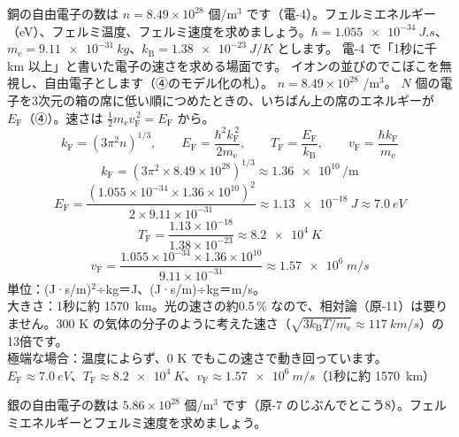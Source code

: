 \label{ph:原-8:ex4}
\begin{phreidai}
銅の自由電子の数は $n=8.49\times10^{28}$ 個/m$^3$ です（電-4）。フェルミエネルギー（eV）、フェルミ温度、フェルミ速度を求めましょう。$\hbar=\qty{1.055e-34}{J.s}$、$m_{\mathrm e}=\qty{9.11e-31}{kg}$、$k_{\mathrm B}=\qty{1.38e-23}{J/K}$ とします。
\phbamen
電-4 で「1秒に千 km 以上」と書いた電子の速さを求める場面です。
\phmushi
イオンの並びのでこぼこを無視し、自由電子とします（④のモデル化の札）。
\phzu
$n=8.49\times10^{28}$ /m$^3$。
\phriyu
$N$ 個の電子を3次元の箱の席に低い順につめたときの、いちばん上の席のエネルギーが $E_{\mathrm F}$（④）。速さは $\tfrac12m_{\mathrm e}v_{\mathrm F}^{\,2}=E_{\mathrm F}$ から。
\phtateru
\[ k_{\mathrm F}=(3\pi^2n)^{1/3},\qquad E_{\mathrm F}=\frac{\hbar^2k_{\mathrm F}^{\,2}}{2m_{\mathrm e}},\qquad T_{\mathrm F}=\frac{E_{\mathrm F}}{k_{\mathrm B}},\qquad v_{\mathrm F}=\frac{\hbar k_{\mathrm F}}{m_{\mathrm e}} \]
\phtoku
\[ k_{\mathrm F}=(3\pi^2\times8.49\times10^{28})^{1/3}\approx\num{1.36e10}\,\mathrm{/m} \]
\[ E_{\mathrm F}=\frac{(1.055\times10^{-34}\times1.36\times10^{10})^2}{2\times9.11\times10^{-31}}\approx\qty{1.13e-18}{J}\approx\qty{7.0}{eV} \]
\[ T_{\mathrm F}=\frac{1.13\times10^{-18}}{1.38\times10^{-23}}\approx\qty{8.2e4}{K} \]
\[ v_{\mathrm F}=\frac{1.055\times10^{-34}\times1.36\times10^{10}}{9.11\times10^{-31}}\approx\qty{1.57e6}{m/s} \]
\phtashikame
単位：(J·s/m)$^2$÷kg＝J、(J·s/m)÷kg＝m/s。\\
大きさ：1秒に約 \qty{1570}{km}。光の速さの約0.5\,\% なので、相対論（原-11）は要りません。300 K の気体の分子のように考えた速さ（$\sqrt{3k_{\mathrm B}T/m_{\mathrm e}}\approx\qty{117}{km/s}$）の13倍です。\\
極端な場合：温度によらず、0 K でもこの速さで動き回っています。
\kotae $E_{\mathrm F}\approx\qty{7.0}{eV}$、$T_{\mathrm F}\approx\qty{8.2e4}{K}$、$v_{\mathrm F}\approx\qty{1.57e6}{m/s}$（1秒に約 \qty{1570}{km}）
\end{phreidai}
\begin{jibun}
銀の自由電子の数は $5.86\times10^{28}$ 個/m$^3$ です（原-7 のじぶんでとこう8）。フェルミエネルギーとフェルミ速度を求めましょう。
\end{jibun}

